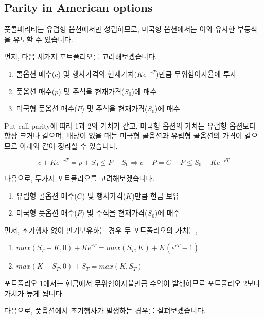 \documentclass[
  letterpaper,
  DIV=11,
  numbers=noendperiod]{scrreprt}
\providecommand{\tightlist}{%
  \setlength{\itemsep}{0pt}\setlength{\parskip}{0pt}}\usepackage{longtable,booktabs,array}
\begin{document}
\subsection*{Parity in American options}\label{sec-AmericanParity}

풋콜패리티는 유럽형 옵션에서만 성립하므로, 미국형 옵션에서는 이와 유사한
부등식을 유도할 수 있습니다.

먼저, 다음 세가지 포트폴리오를 고려해보겠습니다.

\begin{enumerate}
\def\labelenumi{\arabic{enumi}.}
\tightlist
\item
  콜옵션 매수(\(c\)) 및 행사가격의 현재가치(\(Ke^{-rT}\))만큼
  무위험이자율에 투자
\item
  풋옵션 매수(\(p\)) 및 주식을 현재가격(\(S_0\))에 매수
\item
  미국형 풋옵션 매수(\(P\)) 및 주식을 현재가격(\(S_0\))에 매수
\end{enumerate}

Put-call parity에 따라 1과 2의 가치가 같고, 미국형 옵션의 가치는 유럽형
옵션보다 항상 크거나 같으며, 배당이 없을 때는 미국형 콜옵션과 유럽형
콜옵션의 가격이 같으므로 아래와 같이 정리할 수 있습니다.

\[c+Ke^{-rT}=p+S_0\leq P+S_0\Rightarrow c-P=C-P\leq S_0-Ke^{-rT}\]

다음으로, 두가지 포트폴리오를 고려해보겠습니다.

\begin{enumerate}
\def\labelenumi{\arabic{enumi}.}
\tightlist
\item
  유럽형 콜옵션 매수(\(C\)) 및 행사가격(\(K\))만큼 현금 보유
\item
  미국형 풋옵션 매수(\(P\)) 및 주식을 현재가격(\(S_0\))에 매수
\end{enumerate}

먼저, 조기행사 없이 만기보유하는 경우 두 포트폴리오의 가치는,

\begin{enumerate}
\def\labelenumi{\arabic{enumi}.}
\tightlist
\item
  \(max(S_T-K,0)+Ke^{rT}=max(S_T,K)+K(e^{rT}-1)\)
\item
  \(max(K-S_T,0)+S_T=max(K,S_T)\)
\end{enumerate}

포트폴리오 1에서는 현금에서 무위험이자율만큼 수익이 발생하므로
포트폴리오 2보다 가치가 높게 됩니다.

다음으로, 풋옵션에서 조기행사가 발생하는 경우를 살펴보겠습니다.
\end{document}
